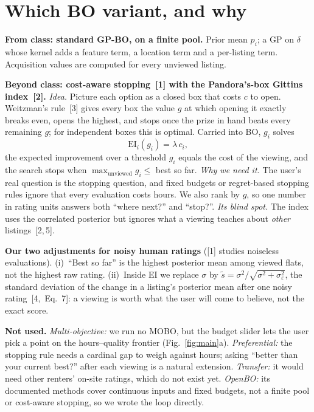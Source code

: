 \documentclass[10pt,a4paper,twocolumn]{article}
\newcommand{\lead}[1]{\textbf{#1}}
\begin{document}
\section{Which BO variant, and why}

\lead{From class: standard GP-BO, on a finite pool.} Prior mean $p_i$; a GP on $\delta$ whose kernel adds a
feature term, a location term and a per-listing term. Acquisition values are computed for every unviewed
listing.

\lead{Beyond class: cost-aware stopping~[1] with the Pandora's-box Gittins index~[2].}
\emph{Idea.} Picture each option as a closed box that costs $c$ to open. Weitzman's rule~[3] gives every box
the value $g$ at which opening it exactly breaks even, opens the highest, and stops once the prize in hand
beats every remaining $g$; for independent boxes this is optimal. Carried into BO, $g_i$ solves
\[ \mathrm{EI}_i(g_i)=\lambda\,c_i , \]
the expected improvement over a threshold $g_i$ equals the cost of the viewing, and the search stops when
$\max_{\text{unviewed}}g_i\le$ best so far.
\emph{Why we need it.} The user's real question is the stopping question, and fixed budgets or regret-based
stopping rules ignore that every evaluation costs hours. We also rank by $g$, so one number in rating units
answers both ``where next?'' and ``stop?''.
\emph{Its blind spot.} The index uses the correlated posterior but ignores what a viewing teaches about
\emph{other} listings~[2,\,5].

\lead{Our two adjustments for noisy human ratings} ([1] studies noiseless evaluations). (i)~``Best so far'' is
the highest posterior mean among viewed flats, not the highest raw rating. (ii)~Inside EI we replace $\sigma$
by $\tilde s=\sigma^2/\sqrt{\sigma^2+\sigma_\varepsilon^2}$, the standard deviation of the change in a
listing's posterior mean after one noisy rating~[4,~Eq.~7]: a viewing is worth what the user will come to
believe, not the exact score.

\lead{Not used.} \emph{Multi-objective:} we run no MOBO, but the budget slider lets the user pick a point on
the hours--quality frontier (Fig.~\ref{fig:main}a). \emph{Preferential:} the stopping rule needs a cardinal
gap to weigh against hours; asking ``better than your current best?'' after each viewing is a natural
extension. \emph{Transfer:} it would need other renters' on-site ratings, which do not exist yet.
\emph{OpenBO:} its documented methods cover continuous inputs and fixed budgets, not a finite pool or
cost-aware stopping, so we wrote the loop directly.
\end{document}
